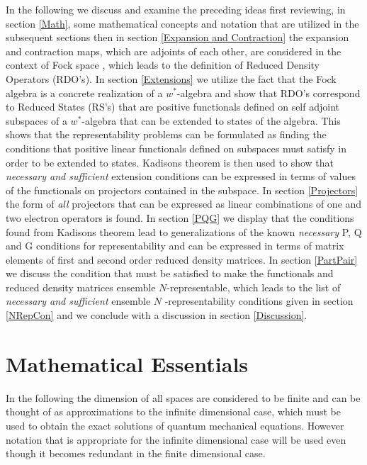 \documentclass[aps,preprint,amsfonts,amssymb,showpacs,showkeys]{revtex4}%
\begin{document}
In the following we discuss and examine the preceding ideas first reviewing,
in section \ref{Math}, some mathematical concepts and notation that are
utilized in the subsequent sections then in section
\ref{Expansion and Contraction} the expansion and contraction maps, which are
adjoints of each other, are considered in the context of Fock space
\cite{Kummar67,Kummar70}, which leads to the definition of Reduced Density
Operators (RDO's). In section \ref{Extensions} we utilize the fact that the
Fock algebra is a concrete realization of a $w^{\ast}$-algebra and show that
RDO's correspond to Reduced States (RS's) that are positive functionals
defined on self adjoint subspaces of a $w^{\ast}$-algebra that can be extended
to states of the algebra. This shows that the representability problems can be
formulated as finding the conditions that positive linear functionals defined
on subspaces must satisfy in order to be extended to states. Kadisons theorem
is then used to show that \emph{necessary and sufficient }extension conditions
can be expressed in terms of values of the functionals on projectors contained
in the subspace. In section \ref{Projectors} the form of \emph{all }projectors
that can be expressed as linear combinations of one and two electron operators
is found. In section \ref{PQG} we display that the conditions found from
Kadisons theorem lead to generalizations of the known \emph{necessary }P, Q
and G conditions for representability and can be expressed in terms of matrix
elements of first and second order reduced density matrices. In section
\ref{PartPair} we discuss the condition that must be satisfied to make the
functionals and reduced density matrices ensemble $N$-representable, which
leads to the list of \emph{necessary and sufficient }ensemble $N$%
-representability conditions given in section \ref{NRepCon} and we conclude
with a discussion in section \ref{Discussion}.

\section{Mathematical Essentials \label{Math}}

In the following the dimension of all spaces are considered to be finite and
can be thought of as approximations to the infinite dimensional case, which
must be used to obtain the exact solutions of quantum mechanical equations.
However notation that is appropriate for the infinite dimensional case will be
used even though it becomes redundant in the finite dimensional case.
\end{document}
